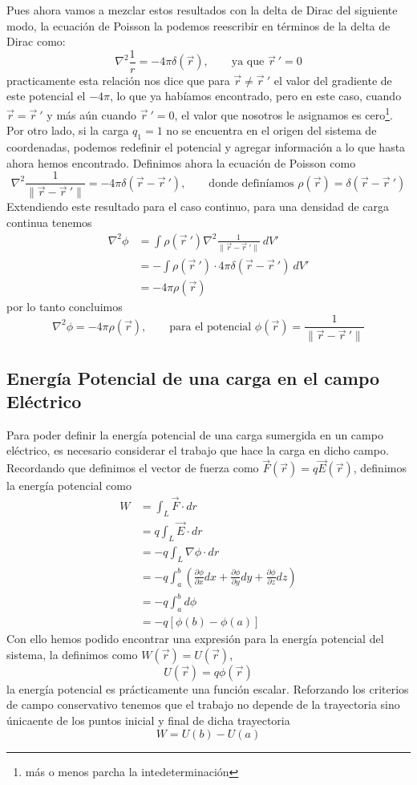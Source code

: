 \documentclass[11pt,a4paper]{article}
\begin{document}
Pues ahora vamos a mezclar estos resultados con la delta de Dirac del siguiente modo, la ecuación de Poisson la podemos reescribir en términos de la delta de Dirac como:
$$\nabla^2\frac{1}{r}=-4\pi\delta(\vec{r}),\qquad\text{ya que }\vec{r}\ '=0$$
practicamente esta relación nos dice que para $\vec{r}\neq\vec{r}\ '$ el valor del gradiente de este potencial el $-4\pi$, lo que ya habíamos encontrado, pero en este caso, cuando $\vec{r}=\vec{r}\ '$ y más aún cuando $\vec{r}\ '=0$, el valor que nosotros le asignamos es cero\footnote{más o menos parcha la intedeterminación}. Por otro lado, si la carga $q_1=1$ no se encuentra en el origen del sistema de coordenadas, podemos redefinir el potencial y agregar información a lo que hasta ahora hemos encontrado. Definimos ahora la ecuación de Poisson como
$$\nabla^2\frac{1}{\|\vec{r}-\vec{r}\ '\|}=-4\pi\delta(\vec{r}-\vec{r}\ '),\qquad \text{donde definíamos }\rho(\vec{r})=\delta(\vec{r}-\vec{r}\ ')$$
Extendiendo este resultado para el caso continuo, para una densidad de carga continua tenemos
\begin{align*}
\nabla^2\phi&=\int\rho(\vec{r}\ ')\nabla^2\frac{1}{\|\vec{r}-\vec{r}\ '\|}\ dV'\\
&=-\int\rho(\vec{r}\ ')\cdot 4\pi\delta(\vec{r}-\vec{r}\ ')\ dV'\\
&=-4\pi\rho(\vec{r})
\end{align*}
por lo tanto concluimos 
$$\nabla^2\phi=-4\pi\rho(\vec{r}),\qquad\text{para el potencial }\phi(\vec{r})=\frac{1}{\|\vec{r}-\vec{r}\ '\|}$$
\newpage
\subsection{Energía Potencial de una carga en el campo Eléctrico}

Para poder definir la energía potencial de una carga sumergida en un campo eléctrico, es necesario considerar el trabajo que hace la carga en dicho campo. Recordando que definimos el vector de fuerza como $\vec{F}(\vec{r})=q\vec{E}(\vec{r})$, definimos la energía potencial como
\begin{align*}
W&=\int_L \vec{F}\cdot dr\\
&=q\int_L\vec{E}\cdot dr\\
&=-q\int_L\nabla\phi\cdot dr\\
&=-q\int_a^b\left(\frac{\partial\phi}{\partial x}dx+\frac{\partial\phi}{\partial y}dy+\frac{\partial \phi}{\partial z}dz\right)\\
&=-q\int_a^b d\phi\\
&=-q\left[\phi(b)-\phi(a)\right]
\end{align*}
Con ello hemos podido encontrar una expresión para la energía potencial del sistema, la definimos como $W(\vec{r})=U(\vec{r})$, 
\begin{equation}\label{eq:trabajoU}
U(\vec{r})=q\phi(\vec{r})
\end{equation}
la energía potencial es prácticamente una función escalar. Reforzando los criterios de campo conservativo tenemos que el trabajo no depende de la trayectoria sino únicaente de los puntos inicial y final de dicha trayectoria
$$W=U(b)-U(a)$$
\end{document}

